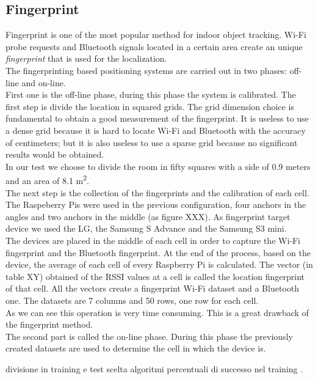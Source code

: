\subsection{Fingerprint}
Fingerprint is one of the most popular method for indoor object tracking. Wi-Fi probe requests and Bluetooth signals located in a certain area create an unique \textit{fingerprint}  that is used for the localization.\\
The fingerprinting based positioning systems are carried out in two phases: off-line and on-line.\\
\linebreak
First one is the off-line phase, during this phase the system is calibrated. The first step is divide the location in squared grids. The grid dimension choice is fundamental to obtain a good measurement of the fingerprint. It is useless to use a dense grid because it is hard to locate Wi-Fi and Bluetooth with the accuracy of centimeters; but it is also useless to use a sparse grid because no significant results would be obtained. \\
In our test we choose to divide the room in fifty squares with a side of 0.9 meters and an area of 8.1 m\textsuperscript{2}.\\
\linebreak
The next step is the collection of the fingerprints and the calibration of each cell. The Raspeberry Pis were used in the previous configuration, four anchors in the angles and two anchors in the middle (as figure XXX). As fingerprint target device we used the LG, the Samsung S Advance and the Samsung S3 mini.\\
The devices are placed in the middle of each cell in order to capture the Wi-Fi fingerprint and the Bluetooth fingerprint. At the end of the process, based on the device, the average of each cell of every Raspberry Pi is calculated. The vector (in table XY) obtained of the RSSI values at a cell is called the location fingerprint of that cell. All the vectors create a fingerprint Wi-Fi dataset and a Bluetooth one.  The datasets are 7 columns and 50 rows, one row for each cell.\\
As we can see this operation is very time consuming. This is a great drawback of the fingerprint method.\\
\linebreak
The second part is called the on-line phase. During this phase the previously created datasets are used to determine the cell in which the device is.

divisione in training e test
scelta algoritmi
percentuali di successo nel training
. 

